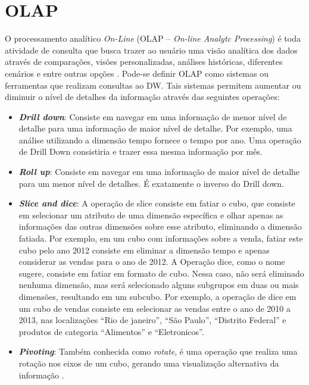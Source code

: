 \section{OLAP}
\label{sec-olap}

%

O processamento analítico \emph{On-Line} (OLAP – \emph{On-line Analytc Processing}) é toda atividade de consulta que busca trazer ao usuário uma visão analítica dos dados através de comparações, visões personalizadas, análises históricas, diferentes cenários e entre outras opções \cite{kimball2002}. Pode-se definir OLAP como sistemas ou ferramentas que realizam consultas ao DW. Tais sistemas permitem aumentar ou diminuir o nível de detalhes da informação através das seguintes operações:

%

\begin{itemize}
	\item \textbf{\emph{Drill down}}: Consiste em navegar em uma informação de menor nível de detalhe para uma informação de maior nível de detalhe. Por exemplo, uma análise utilizando a dimensão tempo fornece o tempo por ano. Uma operação de Drill Down consistiria e trazer essa mesma informação por mês.
	\item \textbf{\emph{Roll up}}: Consiste em navegar em uma informação de maior nível de detalhe para um menor nível de detalhes. É exatamente o inverso do Drill down.
	\item \textbf{\emph{Slice and dice}}: A operação de slice consiste em fatiar o cubo, que consiste em selecionar um atributo de uma dimensão específica e olhar apenas as informações das outras dimensões sobre esse atributo, eliminando a dimensão fatiada. Por exemplo, em um cubo com informações sobre a venda,  fatiar este cubo pelo ano 2012 consiste em eliminar a dimensão tempo e apenas considerar as vendas para o ano de 2012. A Operação dice, como o nome sugere, consiste em fatiar em formato de cubo. Nessa caso, não será eliminado nenhuma dimensão, mas será selecionado alguns subgrupos em duas ou mais dimensões, resultando em um subcubo. Por exemplo,  a operação de dice em um cubo de vendas consiste em selecionar as vendas entre o ano de 2010 a 2013, nas localizações “Rio de janeiro”, “São Paulo”, “Distrito Federal” e produtos de categoria “Alimentos” e “Eletronicos”.
	\item \textbf{\emph{Pivoting}}: Também conhecida como \emph{rotate}, é uma operação que realiza uma rotação nos eixos de um cubo, gerando uma visualização alternativa da informação \cite{cavalcanti2012}. 
\end{itemize}

